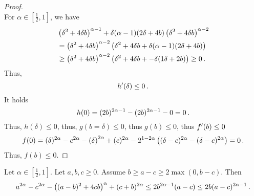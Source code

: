 \begin{proof}
\begin{equation*}
	\end{equation*}
	For $\alpha\in[\frac12,1]$, we have
	\begin{align*}
		&\left( \delta^2+4\delta b \right)^{\alpha-1}+\delta(\alpha-1)(2\delta+4b)\left( \delta^2+4\delta b \right)^{\alpha-2}
		\\&=
		\left( \delta^2+4\delta b \right)^{\alpha-2}\left( \delta^2+4\delta b+\delta (\alpha-1)(2\delta+4b) \right)
		\\& \geq 
		\left( \delta^2+4\delta b \right)^{\alpha-2}\left( \delta^2+4\delta b+ -\delta(1\delta+2b) \right)
		\geq0 
		\, .
	\end{align*}
	Thus, 
	\begin{equation*}
	h^\prime(\delta) \leq 0
	\, .
	\end{equation*}
	It holds
	\begin{equation*}
		h(0) = (2b)^{2\alpha-1}- (2b)^{2\alpha-1} - 0 = 0
		\, .
	\end{equation*}
	Thus, $h(\delta)\leq 0$, thus, $g(b=\delta) \leq 0$, thus $g(b) \leq 0$, thus $f^\prime(b)\leq 0$
	\begin{equation*}
		f(0) = (\delta)^{2\alpha}-c^{2\alpha}-\left( \delta \right)^{2\alpha}+(c)^{2\alpha} -2^{1-2\alpha} \left( 	(\delta-c)^{2\alpha}  -  (\delta-c)^{2\alpha} \right) =0
		\, .
	\end{equation*}
	Thus, $f(b) \leq 0$.
\end{proof}
%
\begin{lemma}
	Let $\alpha\in[\frac12,1]$.
	Let $a,b,c\geq0$.
	Assume $b \geq a-c \geq 2\max(0, b-c)$.
	Then 
	\begin{equation*}
		a^{2\alpha}-c^{2\alpha}-\left( (a-b)^2+4cb \right)^{\alpha}+(c+b)^{2\alpha} 
		\leq 
		2 b^{2\alpha-1} (a-c)
		\leq
		2 b (a-c)^{2\alpha-1}
		\, .
	\end{equation*}
\end{lemma}
%
